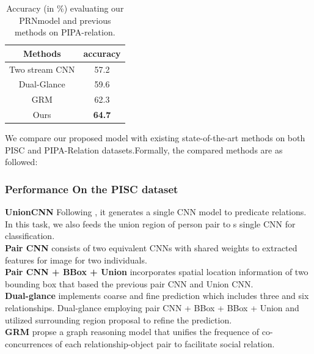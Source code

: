 \documentclass{article}
\newcommand{\PRN}{{\sf PRN}}
\begin{document}
\begin{table}[htpb]
  \centering
  \caption{Accuracy (in \%) evaluating our \PRN model and previous methods on PIPA-relation.}
  \label{tab:pipa_table}
  \begin{tabular}{c|c}
    \hline
    Methods & accuracy \\
    \hline\hline
    Two stream CNN \cite{DBLP:conf/cvpr/ZhangPTFB15} & 57.2 \\
    Dual-Glance \cite{DBLP:conf/iccv/LiWZK17} & 59.6 \\
    GRM \cite{DBLP:conf/ijcai/WangCRYCL18} & 62.3 \\
    \hline
    Ours & \textbf{64.7}\\
    \hline
  \end{tabular}
\end{table}

We compare our proposed model with existing state-of-the-art methods on both PISC and PIPA-Relation datasets.Formally, the compared methods are as followed:

\subsubsection{Performance On the PISC dataset}

{\bf UnionCNN}  Following \cite{DBLP:conf/eccv/LuKBL16}, it generates a single CNN model to predicate relations. In this task, we also feeds the union region of person pair to s single CNN for classification.\\
{\bf Pair CNN}\cite{DBLP:conf/iccv/LiWZK17} consists of two equivalent CNNs with shared weights to extracted features for image for two individuals.\\
{\bf Pair CNN + BBox + Union}\cite{DBLP:conf/iccv/LiWZK17} incorporates spatial location information of two bounding box that based the previous pair CNN and Union CNN.\\
{\bf Dual-glance}\cite{DBLP:conf/iccv/LiWZK17} implements coarse and fine prediction which includes three and six relationships. Dual-glance employing pair CNN + BBox + BBox + Union and utilized surrounding region proposal to refine the prediction.\\
{\bf GRM}\cite{DBLP:conf/ijcai/WangCRYCL18} propse a graph reasoning model that unifies the frequence of co-concurrences of each relationship-object pair to facilitate social relation.
\end{document}
